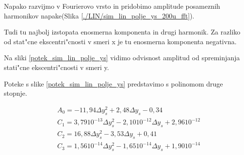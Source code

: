 Napako razvijmo v Fourierovo vrsto in pridobimo amplitude posameznih harmonikov napake(Slika \ref{./LIN/sim_lin_polje_ys_200u_fft}).

Tudi tu najbolj izstopata enosmerna komponenta in drugi harmonik. Za razliko od stat"cne ekscentri"cnosti v smeri x je tu enosmerna komponenta negativna.



Na sliki \ref{potek_sim_lin_polje_ys} vidimo odvisnost amplitud od spreminjanja stati"cne ekscentri"cnosti v smeri y.


Poteke s slike \ref{potek_sim_lin_polje_ys} predstavimo s polinomom druge stopnje.

\begin{eqnarray}
&A_0=-11,94 \Delta y_s^2+2,48\Delta y_s- 0,34\\
&C_1=3,79 10^{-13} \Delta y_s^2-2,10 10^{-12} \Delta y_s+ 2,96 10^{-12}\\
&C_2=16,88 \Delta y_s^2-3,53  \Delta y_s+0,41\\
&C_3=1,56 10^{-14} \Delta y_s^2-1,65 10^{-14} \Delta y_s+1,90 10^{-14}
\end{eqnarray}




